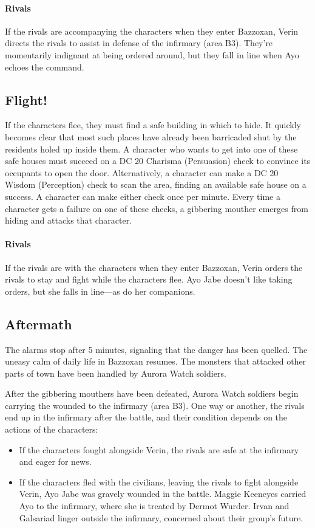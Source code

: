 \documentclass[10pt,a4paper,twoside,twocolumn,openany,nodeprecatedcode]{dndbook}
\begin{document}
\paragraph{Rivals}
If the rivals are accompanying the characters when they enter Bazzoxan, Verin directs the rivals to assist in defense of the infirmary (area B3). They're momentarily indignant at being ordered around, but they fall in line when Ayo echoes the command.

\subsection{Flight!}
If the characters flee, they must find a safe building in which to hide. It quickly becomes clear that most such places have already been barricaded shut by the residents holed up inside them. A character who wants to get into one of these safe houses must succeed on a DC 20 Charisma (Persuasion) check to convince its occupants to open the door. Alternatively, a character can make a DC 20 Wisdom (Perception) check to scan the area, finding an available safe house on a success. A character can make either check once per minute. Every time a character gets a failure on one of these checks, a gibbering mouther emerges from hiding and attacks that character.

\paragraph{Rivals}
If the rivals are with the characters when they enter Bazzoxan, Verin orders the rivals to stay and fight while the characters flee. Ayo Jabe doesn't like taking orders, but she falls in line—as do her companions.

\subsection{Aftermath}
The alarms stop after 5 minutes, signaling that the danger has been quelled. The uneasy calm of daily life in Bazzoxan resumes. The monsters that attacked other parts of town have been handled by Aurora Watch soldiers.

After the gibbering mouthers have been defeated, Aurora Watch soldiers begin carrying the wounded to the infirmary (area B3). One way or another, the rivals end up in the infirmary after the battle, and their condition depends on the actions of the characters:


\begin{itemize}
\item If the characters fought alongside Verin, the rivals are safe at the infirmary and eager for news.
\item If the characters fled with the civilians, leaving the rivals to fight alongside Verin, Ayo Jabe was gravely wounded in the battle. Maggie Keeneyes carried Ayo to the infirmary, where she is treated by Dermot Wurder. Irvan and Galsariad linger outside the infirmary, concerned about their group's future.
\end{itemize}
\end{document}
